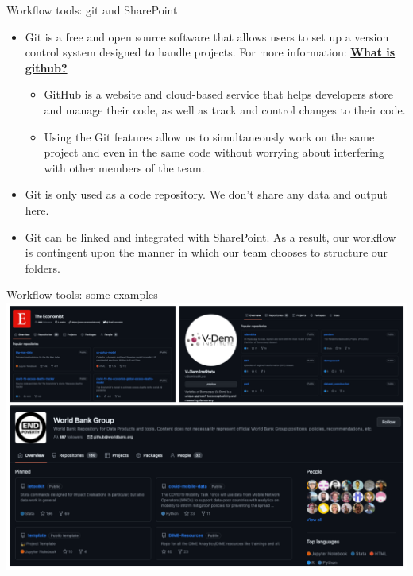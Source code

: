 \documentclass[
  ignorenonframetext,
]{beamer}
\providecommand{\tightlist}{%
  \setlength{\itemsep}{0pt}\setlength{\parskip}{0pt}}\usepackage{longtable,booktabs,array}
\begin{document}
\begin{frame}{Workflow tools: git and SharePoint}
\protect\hypertarget{workflow-tools-git-and-sharepoint}{}
\begin{itemize}
\item
  Git is a free and open source software that allows users to set up a
  version control system designed to handle projects. For more
  information:
  \href{https://kinsta.com/knowledgebase/what-is-github/}{\textbf{What
  is github?}}

  \begin{itemize}
  \tightlist
  \item
    GitHub is a website and cloud-based service that helps developers
    store and manage their code, as well as track and control changes to
    their code.
  \item
    Using the Git features allow us to simultaneously work on the same
    project and even in the same code without worrying about interfering
    with other members of the team.
  \end{itemize}
\item
  Git is only used as a code repository. We don't share any data and
  output here.
\item
  Git can be linked and integrated with SharePoint. As a result, our
  workflow is contingent upon the manner in which our team chooses to
  structure our folders.
\end{itemize}
\end{frame}

\begin{frame}{Workflow tools: some examples}
\protect\hypertarget{workflow-tools-some-examples}{}
\includegraphics{media/github-ex.png}
\end{frame}
\end{document}
